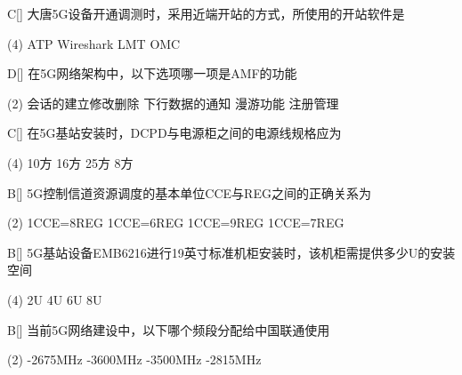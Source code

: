 \begin{choice}{C}[]
    大唐5G设备开通调测时，采用近端开站的方式，所使用的开站软件是
    \begin{tasks}(4)
        \task ATP
        \task Wireshark
        \task LMT
        \task OMC
    \end{tasks}
\end{choice}


\begin{choice}{D}[]
    在5G网络架构中，以下选项哪一项是AMF的功能

    \begin{tasks}(2)
        \task 会话的建立修改删除
        \task 下行数据的通知
        \task 漫游功能
        \task 注册管理
    \end{tasks}
\end{choice}



\begin{choice}{C}[]
    在5G基站安装时，DCPD与电源柜之间的电源线规格应为

    \begin{tasks}(4)
        \task 10方
        \task 16方
        \task 25方
        \task 8方
    \end{tasks}
\end{choice}



\begin{choice}{B}[]
    5G控制信道资源调度的基本单位CCE与REG之间的正确关系为

    \begin{tasks}(2)
        \task 1CCE=8REG
        \task 1CCE=6REG
        \task 1CCE=9REG
        \task 1CCE=7REG
    \end{tasks}
\end{choice}




\begin{choice}{B}[]
    5G基站设备EMB6216进行19英寸标准机柜安装时，该机柜需提供多少U的安装空间
    \begin{tasks}(4)
        \task 2U
        \task 4U
        \task 6U
        \task 8U
    \end{tasks}
\end{choice}

\begin{choice}{B}[]
    当前5G网络建设中，以下哪个频段分配给中国联通使用
    \begin{tasks}(2)
        -2675MHz
        -3600MHz
        -3500MHz
        -2815MHz
    \end{tasks}
\end{choice}

